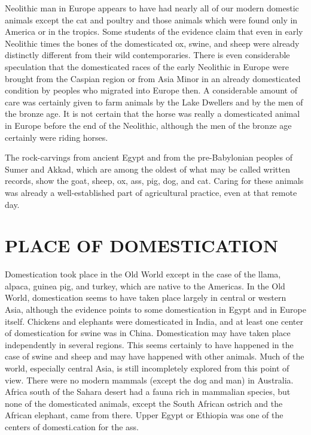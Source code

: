 Neolithic man in Europe appears to have had nearly all of our modern domestic animals except the cat and poultry
and those animals which were found only in America or in the tropics. Some students of the evidence claim that
even in early Neolithic times the bones of the domesticated ox, swine, and sheep were already distinctly different
from their wild contemporaries. There is even considerable speculation that the domesticated races of the early
Neolithic in Europe were brought from the Caspian region or from Asia Minor in an already domesticated condition
by peoples who migrated into Europe then. A considerable amount of care was certainly given to farm animals by the
Lake Dwellers and by the men of the bronze age. It is not certain that the horse was really a domesticated animal
in Europe before the end of the Neolithic, although the men of the bronze age certainly were riding horses.

The rock-carvings from ancient Egypt and from the pre-Babylonian peoples of Sumer and Akkad, which are among the
oldest of what may be called written records, show the goat, sheep, ox, ass, pig, dog, and cat. Caring for these
animals was already a well-established part of agricultural practice, even at that remote day.

\section*{PLACE OF DOMESTICATION}

Domestication took place in the Old World except in the case of the llama, alpaca, guinea pig, and turkey, which
are native to the Americas. In the Old World, domestication seems to have taken place largely in central or
western Asia, although the evidence points to some domestication in Egypt and in Europe itself. Chickens and
elephants were domesticated in India, and at least one center of domestication for swine was in China. Domestication
may have taken place independently in several regions. This seems certainly to have happened in the case of
swine and sheep and may have happened with other animals. Much of the world, especially central Asia, is still
incompletely explored from this point of view. There were no modern mammals (except the dog and man) in Australia.
Africa south of the Sahara desert had a fauna rich in mammalian species, but none of the domesticated animals,
except the South African ostrich and the African elephant, came from there. Upper Egypt or Ethiopia was one of
the centers of domesti.cation for the ass.

